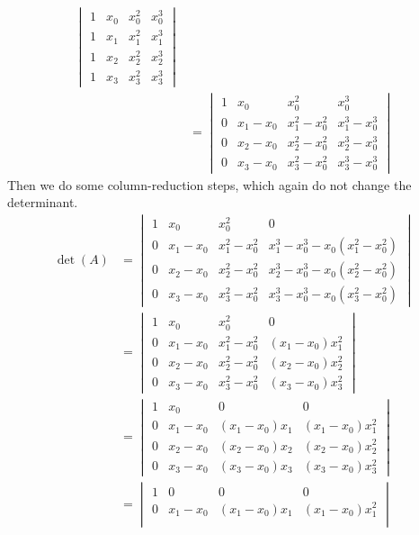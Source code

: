 \documentclass{report}
\begin{document}
\begin{itemize}
\begin{align*}
\begin{vmatrix}
    1 & x_0 & x_0^2 & x_0^3\\
    1 & x_1 & x_1^2 & x_1^3\\
    1 & x_2 & x_2^2 & x_2^3\\
    1 & x_3 & x_3^2 & x_3^3
\end{vmatrix} \\
& = 
\begin{vmatrix}
    1 & x_0 & x_0^2 & x_0^3\\
    0 & x_1-x_0 & x_1^2-x_0^2 & x_1^3-x_0^3\\
    0 & x_2-x_0 & x_2^2-x_0^2 & x_2^3-x_0^3\\
    0 & x_3-x_0 & x_3^2-x_0^2 & x_3^3-x_0^3
\end{vmatrix} 
    \end{align*}
    \bigbreak \noindent 
    Then we do some column-reduction steps, which again do not change the determinant.
    \begin{align*}
        \det(A)
& = 
\begin{vmatrix}
    1 & x_0 & x_0^2 & 0 \\
    0 & x_1-x_0 & x_1^2-x_0^2 & x_1^3-x_0^3 - x_0(x_1^2-x_0^2)\\
    0 & x_2-x_0 & x_2^2-x_0^2 & x_2^3-x_0^3 - x_0(x_2^2-x_0^2)\\
    0 & x_3-x_0 & x_3^2-x_0^2 & x_3^3-x_0^3 - x_0(x_3^2-x_0^2)
\end{vmatrix} \\
& = 
\begin{vmatrix}
    1 & x_0 & x_0^2 & 0 \\
    0 & x_1-x_0 & x_1^2-x_0^2 & (x_1 - x_0)x_1^2\\
    0 & x_2-x_0 & x_2^2-x_0^2 & (x_2 - x_0)x_2^2\\
    0 & x_3-x_0 & x_3^2-x_0^2 & (x_3 - x_0)x_3^2
\end{vmatrix} \\
& = 
\begin{vmatrix}
    1 & x_0 & 0 & 0 \\
    0 & x_1-x_0 & (x_1 - x_0)x_1 & (x_1 - x_0)x_1^2\\
    0 & x_2-x_0 & (x_2 - x_0)x_2 & (x_2 - x_0)x_2^2\\
    0 & x_3-x_0 & (x_3 - x_0)x_3 & (x_3 - x_0)x_3^2
\end{vmatrix} \\
& = 
\begin{vmatrix}
    1 & 0 & 0 & 0 \\
    0 & x_1-x_0 & (x_1 - x_0)x_1 & (x_1 - x_0)x_1^2\\

\end{vmatrix}
\end{align*}
\end{itemize}
\end{document}
